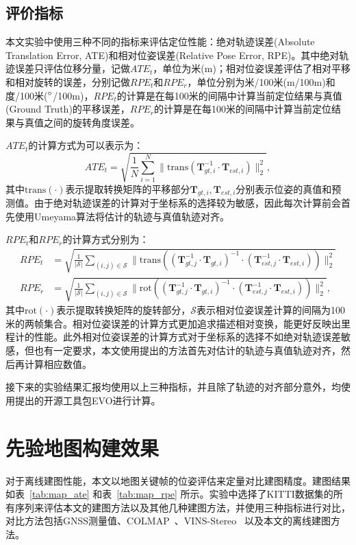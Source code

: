 \subsection{评价指标}

本文实验中使用三种不同的指标来评估定位性能：绝对轨迹误差(Absolute Translation Error, ATE)\cite{sturm2012benchmark}和相对位姿误差(Relative Pose Error, RPE)\cite{geiger2012we}。其中绝对轨迹误差只评估位移分量，记做$ATE_t$，单位为米(m)；相对位姿误差评估了相对平移和相对旋转的误差，分别记做$RPE_{t}$和$RPE_{r}$，单位分别为米/100米(m/100m)和度/100米($\degree$/100m)，$RPE_{t}$的计算是在每100米的间隔中计算当前定位结果与真值(Ground Truth)的平移误差，$RPE_{r}$的计算是在每100米的间隔中计算当前定位结果与真值之间的旋转角度误差。

$ATE_t$的计算方式为可以表示为：
\begin{equation}
  ATE_t = \sqrt{\frac{1}{N}\sum_{i=1}^{N}\|\text{trans}(\symbf{T}_{gt,i}^{-1}\cdot \symbf{T}_{est,i})\|^{2}_{2}},
\end{equation}
其中$\text{trans}(\cdot)$表示提取转换矩阵的平移部分$\symbf{T}_{gt,i}, \symbf{T}_{est,i}$分别表示位姿的真值和预测值。由于绝对轨迹误差的计算对于坐标系的选择较为敏感，因此每次计算前会首先使用Umeyama算法\cite{arun1987least}将估计的轨迹与真值轨迹对齐。

$RPE_{t}$和$RPE_{r}$的计算方式分别为：
\begin{align}
  RPE_{t} &= \sqrt{\frac{1}{|\mathcal{S}|}\sum_{(i,j) \in \mathcal{S}}\| \text{trans}\left ((\symbf{T}_{gt,j}^{-1} \cdot \symbf{T}_{gt,i})^{-1}\cdot (\symbf{T}_{est,j}^{-1} \cdot \symbf{T}_{est,i}) \right ) \|_2^2} \\
  RPE_{r} &= \sqrt{\frac{1}{|\mathcal{S}|}\sum_{(i,j) \in \mathcal{S}}\| \text{rot}\left ((\symbf{T}_{gt,j}^{-1} \cdot \symbf{T}_{gt,i})^{-1}\cdot (\symbf{T}_{est,j}^{-1} \cdot \symbf{T}_{est,i}) \right ) \|_2^2},
\end{align}
其中$\text{rot}(\cdot)$表示提取转换矩阵的旋转部分，$\mathcal{S}$表示相对位姿误差计算的间隔为100米的两帧集合。相对位姿误差的计算方式更加追求描述相对变换，能更好反映出里程计的性能。此外相对位姿误差的计算方式对于坐标系的选择不如绝对轨迹误差敏感，但也有一定要求，本文使用\citet{li2023textslam}提出的方法首先对估计的轨迹与真值轨迹对齐，然后再计算相应数值。

接下来的实验结果汇报均使用以上三种指标，并且除了轨迹的对齐部分意外，均使用\citet{grupp2017evo}提出的开源工具包EVO进行计算。

\section{先验地图构建效果}
对于离线建图性能，本文以地图关键帧的位姿评估来定量对比建图精度。建图结果如表~\ref{tab:map_ate} 和表~\ref{tab:map_rpe} 所示。实验中选择了KITTI数据集的所有序列来评估本文的建图方法以及其他几种建图方法，并使用三种指标进行对比，对比方法包括GNSS测量值、COLMAP~\cite{schonberger2016structure}、VINS-Stereo~\cite{qin2019a} 以及本文的离线建图方法。

